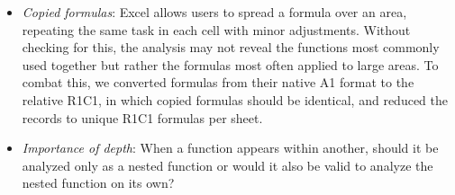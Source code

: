 \documentclass[conference]{IEEEtran}
\begin{document}
	\begin{itemize} \item \textit{Copied formulas}: Excel allows users to spread a
		formula over an area, repeating the same task in each cell with minor
		adjustments. Without checking for this, the analysis may not reveal the
		functions most commonly used together but rather the formulas most often
		applied to large areas. To combat this, we converted formulas from their native
		A1 format to the relative R1C1, in which copied formulas should be identical,
		and reduced the records to unique R1C1 formulas per sheet. \item
		\textit{Importance of depth}: When a function appears within another, should it
		be analyzed only as a nested function or would it also be valid to analyze the
		nested function on its own?
		

\end{itemize}
\end{document}
